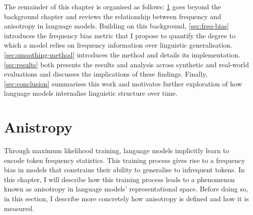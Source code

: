 The remainder of this chapter is organised as follows: \cref{sec:anisotropy-background} goes beyond the background chapter and reviews the relationship between frequency and anisotropy in language models. Building on this background, \cref{sec:freq-bias} introduces the frequency bias metric that I propose to quantify the degree to which a model relies on frequency information over linguistic generalisation. \cref{sec:smoothing-method} introduces the \smoothing method and details its implementation. \cref{sec:results} both presents the results and analysis across synthetic and real-world evaluations and discusses the implications of these findings. Finally, \cref{sec:conclusion} summarises this work and motivates further exploration of how language models internalise linguistic structure over time.

\section{Anistropy}
\label{sec:anisotropy-background}


Through maximum likelihood training, language models implicitly learn to encode token frequency statistics. This training process gives rise to a frequency bias in models that constrains their ability to generalise to infrequent tokens. In this chapter, I will describe how this training process leads to a phenomenon known as anisotropy in language models' representational space. Before doing so, in this section, I describe more concretely how anisotropy is defined and how it is measured.



